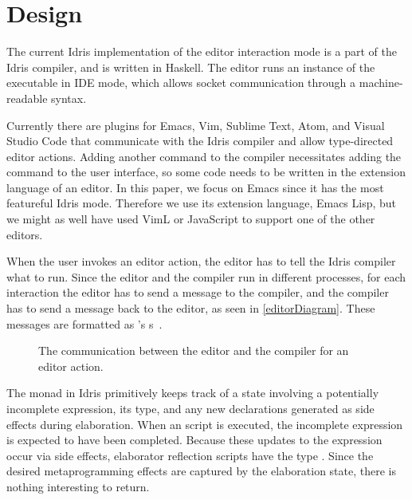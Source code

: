 \section{Design}\label{sec:design}

The current Idris implementation of the editor interaction mode is a part of
the Idris compiler, and is written in Haskell.  The editor runs an instance of
the  executable in IDE mode, which allows socket communication
through a machine-readable syntax.

Currently there are plugins for Emacs, Vim, Sublime Text, Atom, and Visual
Studio Code that communicate with the Idris compiler and allow type-directed
editor actions.
Adding another command to the compiler necessitates adding the command to the
user interface, so some code needs to be written in the extension language of
an editor.
In this paper, we focus on Emacs since it has the most featureful Idris mode.
Therefore we use its extension language, Emacs Lisp, but we might as well have
used VimL or JavaScript to support one of the other editors.

When the user invokes an editor action, the editor has to tell the Idris
compiler what to run. Since the editor and the compiler run in different processes,
for each interaction the editor has to send a message to the compiler,
and the compiler has to send a message back to the editor, as seen in \autoref{editorDiagram}.
These messages are formatted as \citeauthor{mccarthy}'s \sexp{}s~\citep{mccarthy}.

\begin{figure}
\caption{The communication between the editor and the compiler for an editor action.}
\label{editorDiagram}
\end{figure}


The \Elab{} monad in Idris primitively keeps track of a state
involving a potentially incomplete expression, its type, and any new declarations generated as
side effects during elaboration.
When an \Elab{} script is executed, the incomplete expression is expected to have been completed.
Because these updates to the expression occur via side effects, elaborator reflection scripts have the type \mbox{}. Since the
desired metaprogramming effects are captured by the elaboration state, there is
nothing interesting to return.

